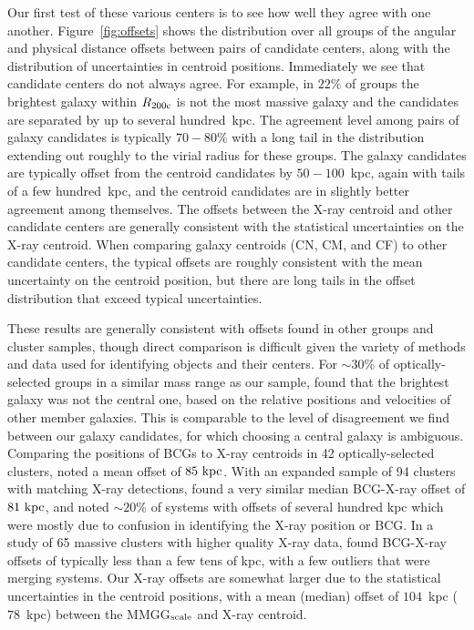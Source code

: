 \documentclass[12pt]{emulateapj}
\begin{document}
Our first test of these various centers is to see how well they agree with one
another. Figure~\ref{fig:offsets} shows the distribution over all
groups of the angular and physical distance offsets between pairs of
candidate centers, along with the distribution of uncertainties in
centroid positions. Immediately we see that candidate centers do not 
always agree. For example, in $22\%$ of groups the brightest galaxy
within $R_{\rm 200c}$ is not the most massive galaxy and the
candidates are separated by up to several hundred~{\rm kpc}. The
agreement level among pairs of galaxy candidates is typically
$70-80\%$ with a long tail in the distribution extending out roughly
to the virial radius for these groups. The galaxy candidates are
typically offset from the centroid candidates by $50-100$~{\rm kpc},
again with tails of a few hundred~{\rm kpc}, and the centroid
candidates are in slightly better agreement among themselves. The
offsets between the X-ray centroid and other candidate centers are
generally consistent with the statistical uncertainties on the X-ray
centroid. When comparing galaxy centroids (CN, CM, and CF) to other
candidate centers, the typical offsets are roughly consistent with the
mean uncertainty on the centroid position, but there are long tails
in the offset distribution that exceed typical uncertainties.

These results are generally consistent with offsets found in other
groups and cluster samples, though direct comparison is difficult
given the variety of methods and data used for identifying objects and
their centers. For $\sim30\%$ of optically-selected groups in a
similar mass range as our sample, \citet{Skibba2011} found that the
brightest galaxy was not the central one, based on the relative positions
and velocities of other member galaxies. This is comparable to the
level of disagreement we find between our galaxy candidates, for which
choosing a central galaxy is ambiguous. Comparing the positions of
BCGs to X-ray centroids in 42 optically-selected clusters,
\citet{Sheldon2001} noted a mean offset of $85~{\rm kpc}$. With an
expanded sample of 94 clusters with matching X-ray detections,
\citet{Koester2007b} found a very similar median BCG-X-ray offset of
$81~{\rm kpc}$, and noted $\sim20\%$ of systems with offsets of
several hundred kpc which were mostly due to confusion in identifying
the X-ray position or BCG. In a study of 65 massive clusters with
higher quality X-ray data, \citet{Sanderson2009} found BCG-X-ray
offsets of typically less than a few tens of kpc, with a few
outliers that were merging systems. Our X-ray offsets are somewhat
larger due to the statistical uncertainties in the centroid positions,
with a mean (median) offset of $104$~{\rm kpc} ($78$~{\rm kpc})
between the MMGG$_{\rm scale}$ and X-ray centroid.
\end{document}
